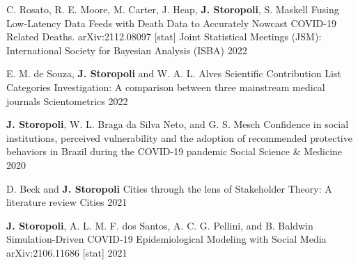 

\begin{cventries}

  \cventry
    {C. Rosato, R. E. Moore, M. Carter, J. Heap, \textbf{J. Storopoli}, S. Maskell} %
    {Fusing Low-Latency Data Feeds with Death Data to Accurately Nowcast COVID-19 Related Deaths. arXiv:2112.08097 [stat]} %
    {Joint Statistical Meetings (JSM): International Society for Bayesian Analysis (ISBA)} %
    {2022} %

  \cventry
    {E. M. de Souza, \textbf{J. Storopoli} and W. A. L. Alves} %
    {Scientific Contribution List Categories Investigation: A comparison between three mainstream medical journals} %
    {Scientometrics} %
    {2022} %

  \cventry
    {\textbf{J. Storopoli}, W. L. Braga da Silva Neto, and G. S. Mesch} %
    {Confidence in social institutions, perceived vulnerability and the adoption of recommended protective behaviors in Brazil during the COVID-19 pandemic} %
    {Social Science \& Medicine} %
    {2020} %

  \cventry
    {D. Beck and \textbf{J. Storopoli}} %
    {Cities through the lens of Stakeholder Theory: A literature review} %
    {Cities} %
    {2021} %

  \cventry
    {\textbf{J. Storopoli}, A. L. M. F. dos Santos, A. C. G. Pellini, and B. Baldwin} %
    {Simulation-Driven COVID-19 Epidemiological Modeling with Social Media} %
    {arXiv:2106.11686 [stat]} %
    {2021} %

\end{cventries}
